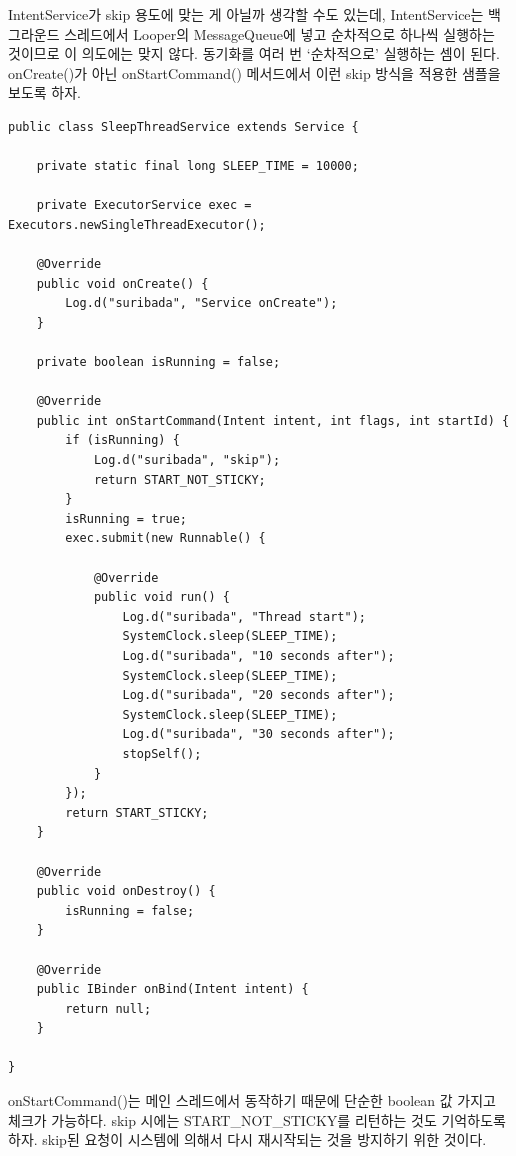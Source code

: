IntentService가 skip 용도에 맞는 게 아닐까 생각할 수도 있는데, 
IntentService는 백그라운드 스레드에서 Looper의 MessageQueue에 넣고 순차적으로 하나씩 실행하는 것이므로 이 의도에는 맞지 않다. 동기화를 여러 번 `순차적으로' 실행하는 셈이 된다.\\

onCreate()가 아닌 onStartCommand() 메서드에서 이런 skip 방식을 적용한 샘플을 보도록 하자.
\begin{lstlisting}[frame=single]
public class SleepThreadService extends Service {

	private static final long SLEEP_TIME = 10000;
	
	private ExecutorService exec = Executors.newSingleThreadExecutor();
	
	@Override
	public void onCreate() {
		Log.d("suribada", "Service onCreate");
	}
	
	private boolean isRunning = false;
	
	@Override
	public int onStartCommand(Intent intent, int flags, int startId) {
		if (isRunning) {
			Log.d("suribada", "skip");
			return START_NOT_STICKY;
		}
		isRunning = true;
		exec.submit(new Runnable() {

			@Override
			public void run() {
				Log.d("suribada", "Thread start");
				SystemClock.sleep(SLEEP_TIME);
				Log.d("suribada", "10 seconds after");
				SystemClock.sleep(SLEEP_TIME);
				Log.d("suribada", "20 seconds after");
				SystemClock.sleep(SLEEP_TIME);
				Log.d("suribada", "30 seconds after");
				stopSelf();
			}
		});
		return START_STICKY;
	}
	
	@Override
	public void onDestroy() {
		isRunning = false;
	}
	
	@Override
	public IBinder onBind(Intent intent) {
		return null;
	}

}
\end{lstlisting}
onStartCommand()는 메인 스레드에서 동작하기 때문에 단순한 boolean 값 가지고 체크가 가능하다.
skip 시에는 START\_NOT\_STICKY를 리턴하는 것도 기억하도록 하자. skip된 요청이 시스템에 의해서 다시 재시작되는 것을 방지하기 위한 것이다. \\


